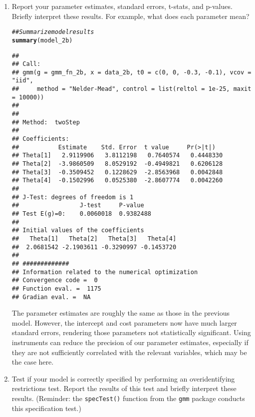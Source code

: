 \documentclass[11pt,letterpaper]{article}\usepackage[]{graphicx}\usepackage[]{xcolor}
\makeatletter
\newcommand{\hlcom}[1]{\textcolor[rgb]{0.678,0.584,0.686}{\textit{#1}}}%
\newcommand{\hlstd}[1]{\textcolor[rgb]{0.345,0.345,0.345}{#1}}%
\newcommand{\hlkwd}[1]{\textcolor[rgb]{0.737,0.353,0.396}{\textbf{#1}}}%
\newenvironment{kframe}{%
 \def\at@end@of@kframe{}%
 \ifinner\ifhmode%
  \def\at@end@of@kframe{\end{minipage}}%
  \begin{minipage}{\columnwidth}%
 \fi\fi%
 \def\FrameCommand##1{\hskip\@totalleftmargin \hskip-\fboxsep
 \colorbox{shadecolor}{##1}\hskip-\fboxsep
     \hskip-\linewidth \hskip-\@totalleftmargin \hskip\columnwidth}%
 \MakeFramed {\advance\hsize-\width
   \@totalleftmargin\z@ \linewidth\hsize
   \@setminipage}}%
 {\par\unskip\endMakeFramed%
 \at@end@of@kframe}
\newenvironment{knitrout}{}{} %
\makeatother
\begin{document}
\begin{enumerate}[label=\alph*., leftmargin=*]
	\begin{enumerate}[label=\roman*.]
		\item Report your parameter estimates, standard errors, t-stats, and p-values. Briefly interpret these results. For example, what does each parameter mean?

\begin{knitrout}
\color{fgcolor}\begin{kframe}
\begin{alltt}
\hlcom{## Summarize model results}
\hlkwd{summary}\hlstd{(model_2b)}
\end{alltt}
\begin{verbatim}
## 
## Call:
## gmm(g = gmm_fn_2b, x = data_2b, t0 = c(0, 0, -0.3, -0.1), vcov = "iid", 
##     method = "Nelder-Mead", control = list(reltol = 1e-25, maxit = 10000))
## 
## 
## Method:  twoStep 
## 
## Coefficients:
##           Estimate    Std. Error  t value     Pr(>|t|)  
## Theta[1]   2.9119906   3.8112198   0.7640574   0.4448330
## Theta[2]  -3.9860509   8.0529192  -0.4949821   0.6206128
## Theta[3]  -0.3509452   0.1228629  -2.8563968   0.0042848
## Theta[4]  -0.1502996   0.0525380  -2.8607774   0.0042260
## 
## J-Test: degrees of freedom is 1 
##                 J-test     P-value  
## Test E(g)=0:    0.0060018  0.9382488
## 
## Initial values of the coefficients
##   Theta[1]   Theta[2]   Theta[3]   Theta[4] 
##  2.0681542 -2.1903611 -0.3290997 -0.1453720 
## 
## #############
## Information related to the numerical optimization
## Convergence code =  0 
## Function eval. =  1175 
## Gradian eval. =  NA
\end{verbatim}
\end{kframe}
\end{knitrout}

		The parameter estimates are roughly the same as those in the previous model. However, the intercept and cost parameters now have much larger standard errors, rendering those parameters not statistically significant. Using instruments can reduce the precision of our parameter estimates, especially if they are not sufficiently correlated with the relevant variables, which may be the case here.

		\item Test if your model is correctly specified by performing an overidentifying restrictions test. Report the results of this test and briefly interpret these results. (Reminder: the \texttt{specTest()} function from the \texttt{gmm} package conducts this specification test.)


\end{enumerate}
\end{enumerate}
\end{document}
